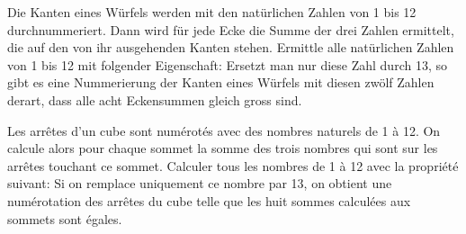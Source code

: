 Die Kanten eines Würfels werden mit den natürlichen Zahlen von 1 bis 12 durchnummeriert. Dann wird für jede Ecke die Summe der drei Zahlen ermittelt, die auf den von ihr ausgehenden Kanten stehen. Ermittle alle natürlichen Zahlen von 1 bis 12 mit folgender Eigenschaft: Ersetzt man nur diese Zahl durch 13, so gibt es eine Nummerierung der Kanten eines Würfels mit diesen zwölf Zahlen derart, dass alle acht Eckensummen gleich gross sind.

\bigskip

Les arrêtes d'un cube sont numérotés avec des nombres naturels de 1 à 12. On calcule alors pour chaque sommet la somme des trois nombres qui sont sur les arrêtes touchant ce sommet. Calculer tous les nombres de 1 à 12 avec la propriété suivant: Si on remplace uniquement ce nombre par 13, on obtient une numérotation des arrêtes du cube telle que les huit sommes calculées aux sommets sont égales.